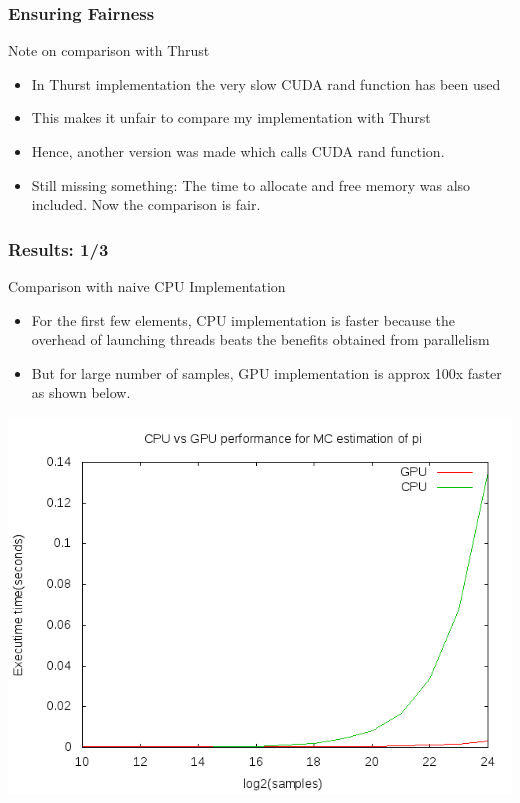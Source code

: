 \documentclass[mathserif]{beamer}
\begin{document}
\begin{frame}                                                                                                                                                                          
\frametitle{Ensuring Fairness}
\begin{block}{Note on comparison with Thrust}
\begin{itemize}
\item In Thurst implementation the very slow CUDA rand function has been used 
\item This makes it unfair to compare my implementation with Thurst 
\item Hence, another version was made which calls CUDA rand function.  
\item Still missing something: The time to allocate and free memory was also included. Now the comparison is fair.  
\end{itemize}
\end{block}
\end{frame}             
 

\begin{frame}                                                                                                                                                                          
\frametitle{Results: 1/3}
\begin{block}{Comparison with naive CPU Implementation}
\begin{itemize}
\item For the first few elements, CPU implementation is faster because the overhead of launching threads beats the benefits obtained from parallelism 
\item But for large number of samples, GPU implementation is approx 100x faster as shown below.
\end{itemize}
\end{block}
\begin{center}
\includegraphics[scale=0.3]{cpu_gpu.png}
\end{center}
\end{frame}             
 
\end{document}
